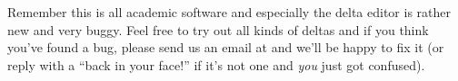 Remember this is all academic software and especially the delta editor is rather new and very buggy.
Feel free to try out all kinds of deltas and if you think you've found a bug, please send us an email at \emoflonMail and we'll be happy to fix it (or reply with a \enquote{back in your face!} if it's not one and \emph{you} just got confused).

